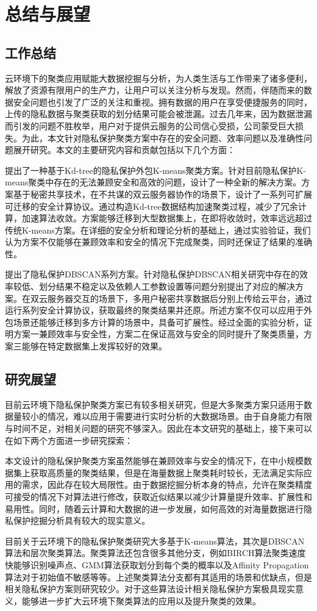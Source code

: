 \chapter{总结与展望}
\section{工作总结}
云环境下的聚类应用赋能大数据挖掘与分析，为人类生活与工作带来了诸多便利，解放了资源有限用户的生产力，让用户可以关注分析与发现。然而，伴随而来的数据安全问题也引发了广泛的关注和重视。拥有数据的用户在享受便捷服务的同时，上传的隐私数据与聚类获取的划分结果可能会被泄漏。过去几年来，因为数据泄漏而引发的问题不胜枚举，用户对于提供云服务的公司信心受损，公司蒙受巨大损失。为此，本文针对隐私保护聚类方案中存在的安全问题、效率问题以及准确性问题展开研究。本文的主要研究内容和贡献包括以下几个方面：

\begin{compactitem}
	\item 
	提出了一种基于Kd-tree的隐私保护外包K-means聚类方案。针对目前隐私保护K-means聚类中存在的无法兼顾安全和高效的问题，设计了一种全新的解决方案。方案基于秘密共享技术，在不共谋的双云服务器协作的场景下，设计了一系列可扩展可迁移的安全计算协议。通过构造Kd-tree数据结构加速聚类过程，减少了冗余计算，加速算法收敛。方案能够迁移到大型数据集上，在即将收敛时，效率远远超过传统K-means方案。在详细的安全分析和理论分析的基础上，通过实验验证，我们认为方案不仅能够在兼顾效率和安全的情况下完成聚类，同时还保证了结果的准确性。
	\item 
	提出了隐私保护DBSCAN系列方案。针对隐私保护DBSCAN相关研究中存在的效率较低、划分结果不稳定以及依赖人工参数设置等问题分别提出了对应的解决方案。在双云服务器交互的场景下，多用户秘密共享数据后分别上传给云平台，通过运行系列安全计算协议，获取最终的聚类结果并还原。所述方案不仅可以应用于外包场景还能够迁移到多方计算的场景中，具备可扩展性。经过全面的实验分析，证明方案一兼顾效率与安全性，方案二在保证高效与安全的同时提升了聚类质量，方案三能够在特定数据集上发挥较好的效果。
\end{compactitem}

\section{研究展望}
目前云环境下隐私保护聚类方案已有较多相关研究，但是大多聚类方案只适用于数据量较小的情况，难以应用于需要进行实时分析的大数据场景。由于自身能力有限与时间不足，对相关问题的研究不够深入。因此在本文研究的基础上，接下来可以在如下两个方面进一步研究探索：

本文设计的隐私保护聚类方案虽然能够在兼顾效率与安全的情况下，在中小规模数据集上获取高质量的聚类结果，但是在海量数据上聚类耗时较长，无法满足实际应用的需求，因此存在较大局限性。由于数据挖掘分析本身的特点，允许在聚类精度可接受的情况下对算法进行修改，获取近似结果以减少计算量提升效率、扩展性和易用性。同时，随着云计算和大数据的进一步发展，如何高效的对海量数据进行隐私保护挖掘分析具有较大的现实意义。

目前关于云环境下的隐私保护聚类研究大多基于K-means算法，其次是DBSCAN算法和层次聚类算法。聚类算法还包含很多其他分支，例如BIRCH算法聚类速度快能够识别噪声点、GMM算法获取划分到每个类的概率以及Affinity Propagation算法对于初始值不敏感等等。上述聚类算法分支都有其适用的场景和优缺点，但是相关隐私保护方案则研究较少。对于这些算法设计相关隐私保护方案极具现实意义，能够进一步扩大云环境下聚类算法的应用以及提升聚类的效果。